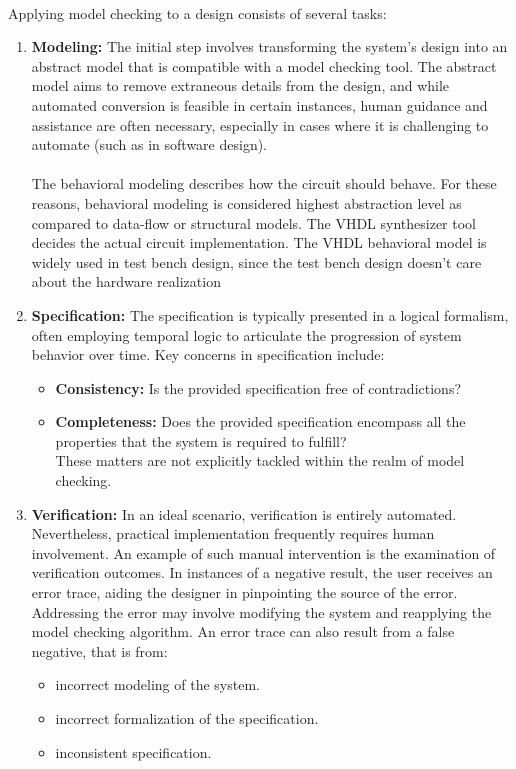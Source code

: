 \paragraph*{}
Applying model checking to a design consists of several tasks:
\begin{enumerate}
	\item \textbf{Modeling:} The initial step involves transforming the system's design into an abstract model that is compatible with a model checking tool. The abstract model aims to remove extraneous details from the design, and while automated conversion is feasible in certain instances, human guidance and assistance are often necessary, especially in cases where it is challenging to automate (such as in software design).
	\paragraph*{}
	The behavioral modeling describes how the circuit should behave.	For these reasons, behavioral modeling is considered highest abstraction level as compared to data-flow or structural models.
	The VHDL synthesizer tool decides the actual circuit implementation.
	The VHDL behavioral model is widely used in test bench design, since the test bench design doesn’t care about the hardware realization
	\item \textbf{Specification:} The specification is typically presented in a logical formalism, often employing temporal logic to articulate the progression of system behavior over time. Key concerns in specification include:
	\begin{itemize}
		\item \textbf{ Consistency:} Is the provided specification free of contradictions?
		\item \textbf{Completeness:} Does the provided specification encompass all the properties that the system is required to fulfill?\\
		These matters are not explicitly tackled within the realm of model checking.		
	\end{itemize} 
	
	\item \textbf{Verification:} In an ideal scenario, verification is entirely automated. Nevertheless, practical implementation frequently requires human involvement. An example of such manual intervention is the examination of verification outcomes. In instances of a negative result, the user receives an error trace, aiding the designer in pinpointing the source of the error. Addressing the error may involve modifying the system and reapplying the model checking algorithm. An error trace can also result from a false negative, that is from:
		\begin{itemize}
		\item incorrect modeling of the system.
		\item incorrect formalization of the specification.
		\item inconsistent specification.

\end{itemize}
\end{enumerate}
